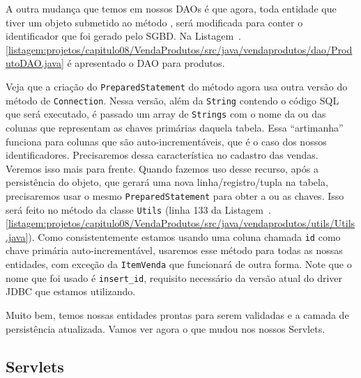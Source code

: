 
A outra mudança que temos em nossos DAOs é que agora, toda entidade que tiver um objeto submetido ao método , será modificada para conter o identificador que foi gerado pelo SGBD. Na Listagem~\thechapter.\ref{listagem:projetos/capitulo08/VendaProdutos/src/java/vendaprodutos/dao/ProdutoDAO.java} é apresentado o DAO para produtos.


Veja que a criação do \texttt{PreparedStatement} do método  agora usa outra versão do método  de \texttt{Connection}. Nessa versão, além da \texttt{String} contendo o código SQL que será executado, é passado um array de \texttt{Strings} com o nome da ou das colunas que representam as chaves primárias daquela tabela. Essa ``artimanha'' funciona para colunas que são auto-incrementáveis, que é o caso dos nossos identificadores. Precisaremos dessa característica no cadastro das vendas. Veremos isso mais para frente. Quando fazemos uso desse recurso, após a persistência do objeto, que gerará uma nova linha/registro/tupla na tabela, precisaremos usar o mesmo \texttt{PreparedStatement} para obter a ou as chaves. Isso será feito no método  da classe \texttt{Utils} (linha 133 da Listagem~\thechapter.\ref{listagem:projetos/capitulo08/VendaProdutos/src/java/vendaprodutos/utils/Utils.java}). Como consistentemente estamos usando uma coluna chamada \texttt{id} como chave primária auto-incrementável, usaremos esse método para todas as nossas entidades, com exceção da \texttt{ItemVenda} que funcionará de outra forma. Note que o nome que foi usado é \texttt{insert\_id}, requisito necessário da versão atual do driver JDBC que estamos utilizando.

Muito bem, temos nossas entidades prontas para serem validadas e a camada de persistência atualizada. Vamos ver agora o que mudou nos nossos Servlets.


\subsection{Servlets}


